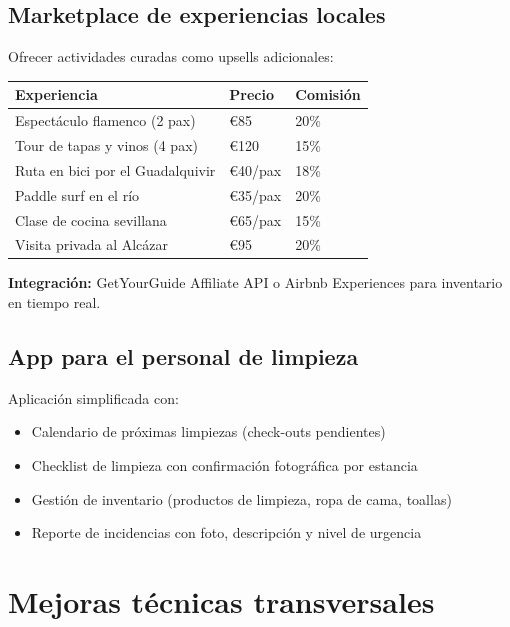 \documentclass[12pt,a4paper,twoside,openright]{report}
\begin{document}
\subsection{Marketplace de experiencias locales}

Ofrecer actividades curadas como upsells adicionales:

\begin{longtable}{L{6.5cm} C{2cm} C{2cm}}
  \toprule
  \textbf{Experiencia} & \textbf{Precio} & \textbf{Comisión} \\
  \midrule
  Espectáculo flamenco (2 pax) & \euro{}85 & 20\% \\
  Tour de tapas y vinos (4 pax) & \euro{}120 & 15\% \\
  Ruta en bici por el Guadalquivir & \euro{}40/pax & 18\% \\
  Paddle surf en el río & \euro{}35/pax & 20\% \\
  Clase de cocina sevillana & \euro{}65/pax & 15\% \\
  Visita privada al Alcázar & \euro{}95 & 20\% \\
  \bottomrule
\end{longtable}

\textbf{Integración:} GetYourGuide Affiliate API o Airbnb Experiences para inventario en tiempo real.

\subsection{App para el personal de limpieza}

Aplicación simplificada con:
\begin{itemize}
  \item Calendario de próximas limpiezas (check-outs pendientes)
  \item Checklist de limpieza con confirmación fotográfica por estancia
  \item Gestión de inventario (productos de limpieza, ropa de cama, toallas)
  \item Reporte de incidencias con foto, descripción y nivel de urgencia
\end{itemize}

\section{Mejoras técnicas transversales}
\end{document}
